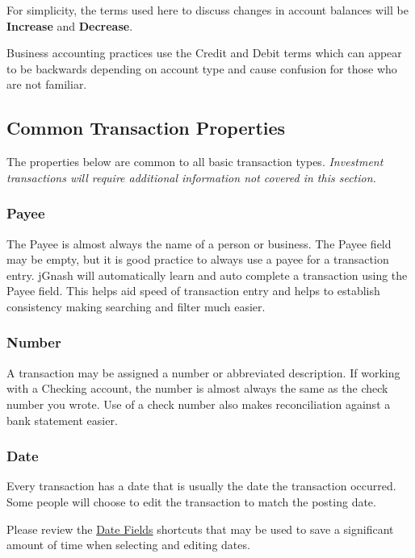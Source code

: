 \documentclass[letterpaper,12pt]{book}
\begin{document}
    \begin{mdframed}[style=info]
        For simplicity, the terms used here to discuss changes in account balances will be \textbf{Increase} and \textbf{Decrease}.

        Business accounting practices use the Credit and Debit terms which can appear to be backwards depending on account type
        and cause confusion for those who are not familiar.
    \end{mdframed}

    \subsection{Common Transaction Properties}
    The properties below are common to all basic transaction types.  \textit{Investment transactions will
    require additional information not covered in this section.}

    \subsubsection*{Payee}
    The Payee is almost always the name of a person or business. The Payee field may be empty, but
    it is good practice to always use a payee for a transaction entry. jGnash will automatically learn
    and auto complete a transaction using the Payee field. This helps aid speed of transaction entry and
    helps to establish consistency making searching and filter much easier.

    \subsubsection*{Number}
    A transaction may be assigned a number or abbreviated description.
    If working with a Checking account, the number is almost always the same as the check number you wrote.
    Use of a check number also makes reconciliation against a bank statement easier.

    \subsubsection*{Date}
    Every transaction has a date that is usually the date the transaction occurred.
    Some people will choose to edit the transaction to match the posting date.

    Please review the \hyperref[subsec:dateFields]{Date Fields} shortcuts that may be used to save a significant
    amount of time when selecting and editing dates.
\end{document}
